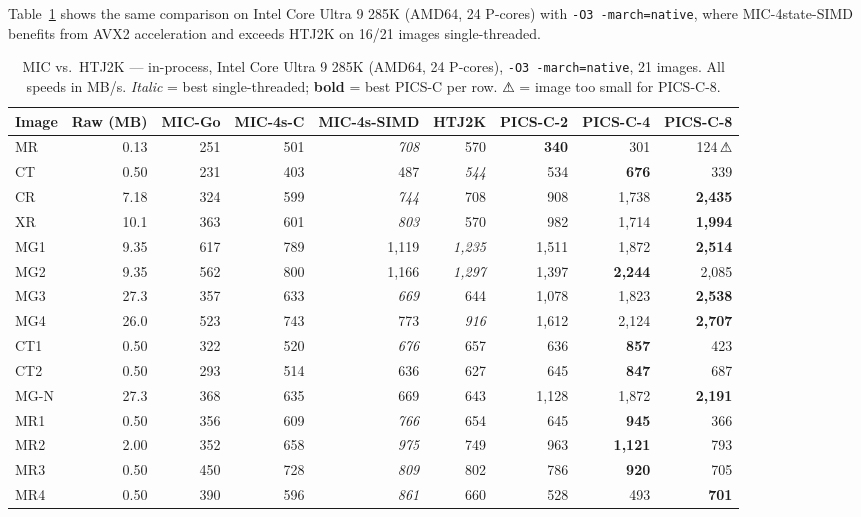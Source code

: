 \documentclass[10pt,twocolumn]{article}
\begin{document}
Table~\ref{tab:htj2k_amd64} shows the same comparison on Intel Core Ultra 9 285K (AMD64, 24 P-cores) with \texttt{-O3 -march=native}, where MIC-4state-SIMD benefits from AVX2 acceleration and exceeds HTJ2K on 16/21 images single-threaded.

\begin{table}[t]
  \centering
  \caption{MIC vs.\ HTJ2K --- in-process, Intel Core Ultra 9 285K (AMD64, 24 P-cores), \texttt{-O3 -march=native}, 21 images. All speeds in MB/s. \textit{Italic} = best single-threaded; \textbf{bold} = best PICS-C per row. ⚠ = image too small for PICS-C-8.}
  \label{tab:htj2k_amd64}
  \small
  \setlength{\tabcolsep}{4pt}
  \begin{tabular}{lrrrrrrrr}
    \toprule
    Image & Raw (MB) & MIC-Go & MIC-4s-C & MIC-4s-SIMD & HTJ2K & PICS-C-2 & PICS-C-4 & PICS-C-8 \\
    \midrule
    MR  & 0.13 & 251 & 501 & \textit{708} & 570 & \textbf{340} & 301 & 124\,⚠ \\
    CT  & 0.50 & 231 & 403 & 487 & \textit{544} & 534 & \textbf{676} & 339 \\
    CR  & 7.18 & 324 & 599 & \textit{744} & 708 & 908 & 1,738 & \textbf{2,435} \\
    XR  & 10.1 & 363 & 601 & \textit{803} & 570 & 982 & 1,714 & \textbf{1,994} \\
    MG1 & 9.35 & 617 & 789 & 1,119 & \textit{1,235} & 1,511 & 1,872 & \textbf{2,514} \\
    MG2 & 9.35 & 562 & 800 & 1,166 & \textit{1,297} & 1,397 & \textbf{2,244} & 2,085 \\
    MG3 & 27.3 & 357 & 633 & \textit{669} & 644 & 1,078 & 1,823 & \textbf{2,538} \\
    MG4 & 26.0 & 523 & 743 & 773 & \textit{916} & 1,612 & 2,124 & \textbf{2,707} \\
    CT1 & 0.50 & 322 & 520 & \textit{676} & 657 & 636 & \textbf{857} & 423 \\
    CT2 & 0.50 & 293 & 514 & 636 & 627 & 645 & \textbf{847} & 687 \\
    MG-N & 27.3 & 368 & 635 & 669 & 643 & 1,128 & 1,872 & \textbf{2,191} \\
    MR1 & 0.50 & 356 & 609 & \textit{766} & 654 & 645 & \textbf{945} & 366 \\
    MR2 & 2.00 & 352 & 658 & \textit{975} & 749 & 963 & \textbf{1,121} & 793 \\
    MR3 & 0.50 & 450 & 728 & \textit{809} & 802 & 786 & \textbf{920} & 705 \\
    MR4 & 0.50 & 390 & 596 & \textit{861} & 660 & 528 & 493 & \textbf{701} \\

\end{tabular}
\end{table}
\end{document}
